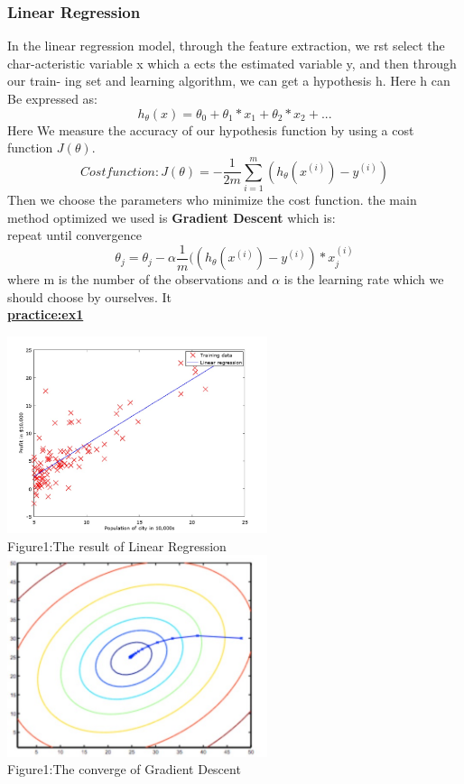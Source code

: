\documentclass[a4paper]{article}
\begin{document}
{\subsubsection{\textbf{Linear Regression}}
In the linear regression model, through the feature extraction, we rst select the char-acteristic variable x which a ects the estimated variable y, and then through our train- ing set and learning algorithm, we can get a hypothesis h. Here h can Be expressed as:$$h_\theta(x)=\theta_0+\theta_1*x_1+\theta_2*x_2+...$$
Here We measure the accuracy of our hypothesis function by using a cost function $J(\theta)$.$$Cost function: J(\theta)=-\frac{1}{2m}\sum_{i=1}^{m}(h_\theta(x^{(i)})-y^{(i)})$$ Then we choose the parameters who minimize the cost function. the main method optimized we used is \textbf{Gradient Descent} which is:\\repeat until convergence$$\theta_j=\theta_j-\alpha\frac{1}{m}((h_\theta(x^{(i)})-y^{(i)})*x_j^{(i)}$$where m is the number of the observations and $\alpha$ is the learning rate which we should choose by ourselves. It \\
\textbf{\href{https://github.com/GuangYueCHEN/ENSIIE/tree/master/Plus/MachineLearning/machine-learning-ex1}{practice:ex1} }\\
\begin{center}
\includegraphics[width=3in]{linear.png}\\
Figure1:The result of Linear Regression
\includegraphics[width=3in]{grad.png}\\
Figure1:The converge of Gradient Descent
\end{center}
}
\end{document}
